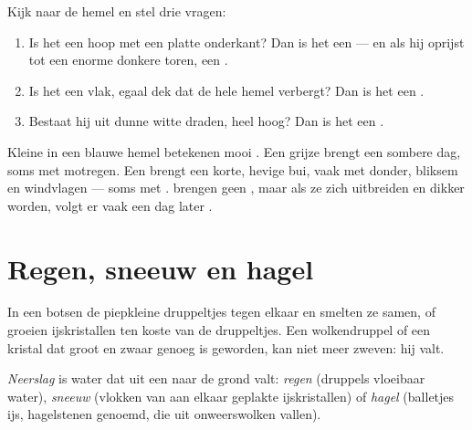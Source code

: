 \begin{method}\label{met:g4:clouds-rain-snow:naming}
Kijk naar de hemel en stel drie vragen:
\begin{enumerate}
  \item Is het een hoop met een platte onderkant? Dan is het een 
        --- en als hij oprijst tot een enorme donkere toren, een
        .
  \item Is het een vlak, egaal dek dat de hele hemel verbergt? Dan is het
        een .
  \item Bestaat hij uit dunne witte draden, heel hoog? Dan is het een .
\end{enumerate}
\end{method}

\begin{remark}\label{rem:g4:clouds-rain-snow:tell}
Kleine  in een blauwe hemel betekenen mooi . Een grijze 
brengt een sombere dag, soms met motregen. Een  brengt een
korte, hevige bui, vaak met donder, bliksem en windvlagen --- soms met
.  brengen geen , maar als ze zich uitbreiden en dikker
worden, volgt er vaak een dag later .
\end{remark}

\section{Regen, sneeuw en hagel}

In een  botsen de piepkleine druppeltjes tegen elkaar en smelten ze
samen, of groeien ijskristallen ten koste van de druppeltjes. Een
wolkendruppel of een kristal dat groot en zwaar genoeg is geworden, kan
niet meer zweven: hij valt.

\begin{definition}[Neerslag]\label{def:g4:clouds-rain-snow:precipitation}
\emph{Neerslag} is water dat uit een  naar de grond
valt: \emph{regen} (druppels vloeibaar water),
\emph{sneeuw} (vlokken van aan elkaar geplakte ijskristallen)
of \emph{hagel} (balletjes ijs, hagelstenen genoemd, die uit
onweerswolken vallen).
\end{definition}

